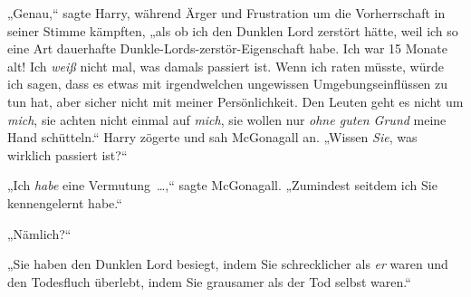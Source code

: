 „Genau,“ sagte Harry, während Ärger und Frustration um die Vorherrschaft in seiner Stimme kämpften, „als ob ich den Dunklen Lord zerstört hätte, weil ich so eine Art dauerhafte Dunkle-Lords-zerstör-Eigenschaft habe. Ich war 15 Monate alt! Ich \emph{weiß} nicht mal, was damals passiert ist. Wenn ich raten müsste, würde ich sagen, dass es etwas mit irgendwelchen ungewissen Umgebungseinflüssen zu tun hat, aber sicher nicht mit meiner Persönlichkeit. Den Leuten geht es nicht um \emph{mich}, sie achten nicht einmal auf \emph{mich}, sie wollen nur \emph{ohne guten Grund} meine Hand schütteln.“ Harry zögerte und sah McGonagall an. „Wissen \emph{Sie}, was wirklich passiert ist?“

„Ich \emph{habe} eine Vermutung …,“ sagte McGonagall. „Zumindest seitdem ich Sie kennengelernt habe.“

„Nämlich?“

„Sie haben den Dunklen Lord besiegt, indem Sie schrecklicher als \emph{er} waren und den Todesfluch überlebt, indem Sie grausamer als der Tod selbst waren.“

